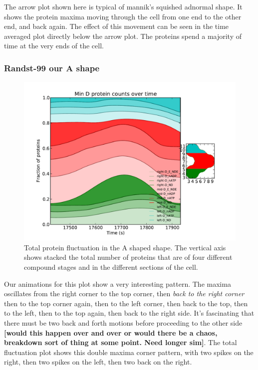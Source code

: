 \documentclass[letterpaper,twocolumn,amsmath,amssymb,pre]{revtex4-1}
\newcommand{\red}[1]{{\bf \color{red} #1}}
\newcommand{\fixme}[1]{\red{[#1]}}
\begin{document}
The arrow plot shown here is typical of mannik's squished adnormal
shape.  It shows the protein maxima moving through the cell from one
end to the other end, and back again.  The effect of this movement can
be seen in the time averaged plot directly below the arrow plot.  The
proteins spend a majority of time at the very ends of the cell.

\subsubsection{Randst-99 our A shape}
\begin{figure}
  \includegraphics[width=\columnwidth]{../data/shape-randst/plots/box-plot_D--randst-25-600-600-9900-1500}
  \caption{Total protein fluctuation in the A shaped shape.  The vertical axis shows stacked the total number
    of proteins that are of four different compound stages and in the
    different sections of the cell.}
  \label{total-oscillation-randst-96-plot}
\end{figure}
Our animations for this plot show a very interesting pattern.  The
maxima oscillates from the right corner to the top corner, then
\emph{back to the right corner} then to the top corner again, then to
the left corner, then back to the top, then to the left, then to the
top again, then back to the right side.  It's fascinating that there
must be two back and forth motions before proceeding to the other side
\fixme{would this happen over and over or would there be a chaos,
  breakdown sort of thing at some point.  Need longer sim}.  The total
fluctuation plot shows this double maxima corner pattern, with two
spikes on the right, then two spikes on the left, then two back on the
right.
\end{document}
